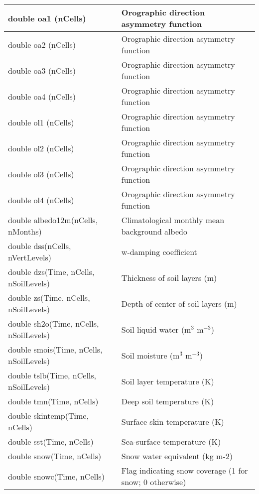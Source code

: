 {\begin{longtable}{|p{2.5in} |p{3.75in}|}
        double oa1 (nCells) & Orographic direction asymmetry function \\ \hline
        double oa2 (nCells) & Orographic direction asymmetry function \\ \hline
       double oa3 (nCells) & Orographic direction asymmetry function  \\ \hline
       double oa4 (nCells) & Orographic direction asymmetry function  \\ \hline
       double ol1 (nCells) & Orographic direction asymmetry function  \\ \hline
       double ol2 (nCells) & Orographic direction asymmetry function  \\ \hline
       double ol3 (nCells) & Orographic direction asymmetry function  \\ \hline
       double ol4 (nCells) & Orographic direction asymmetry function  \\ \hline
        double albedo12m(nCells, nMonths)    & Climatological monthly mean background albedo \\ \hline
        double dss(nCells, nVertLevels)         & w-damping coefficient \\ \hline
        double dzs(Time, nCells, nSoilLevels)       & Thickness of soil layers (m) \\ \hline
        double zs(Time, nCells, nSoilLevels)        & Depth of center of soil layers (m) \\ \hline
        double \hfil\break sh2o(Time, nCells, nSoilLevels)      & Soil liquid water (m$^{3}$ m$^{-3}$) \\ \hline
        double \hfil\break smois(Time, nCells, nSoilLevels)     & Soil moisture (m$^{3}$ m$^{-3}$) \\ \hline
        double tslb(Time, nCells, nSoilLevels)      & Soil layer temperature (K) \\ \hline
        double tmn(Time, nCells)                    & Deep soil temperature (K) \\ \hline
        double skintemp(Time, nCells)               & Surface skin temperature (K) \\ \hline
        double sst(Time, nCells)                    & Sea-surface temperature (K) \\ \hline
        double snow(Time, nCells)                   & Snow water equivalent (kg m-2) \\ \hline
        double snowc(Time, nCells)                  & Flag indicating snow coverage (1 for snow; 0 otherwise) \\ \hline

\end{longtable}}
